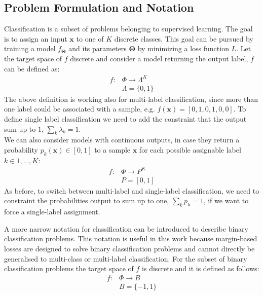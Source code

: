 \documentclass[sn-mathphys-num]{sn-jnl}%
\renewcommand\vec{\mathbf}
\begin{document}
\subsection{Problem Formulation and Notation}\label{subsec-classification_losses_problem_formulation}
Classification is a subset of problems belonging to supervised learning.
The goal is to assign an input $\vec{x}$ to one of $K$ discrete classes. This goal can be pursued by training a model $f_{\vec{\Theta}}$ and its parameters $\vec{\Theta}$ by minimizing a loss function $L$. Let the target space of $f$ discrete and consider a model returning the output label, $f$ can be defined as:
\begin{align*}
        f \colon &\Phi \to \Lambda^K\\
        &\Lambda = \{0,1\}
\end{align*}
The above definition is working also for multi-label classification, since more than one label could be associated with a sample, e.g. $f(\vec{x})= [0, 1, 0, 1, 0, 0]$. To define single label classification we need to add the constraint that the output sum up to $1$, $\sum_k \lambda_k = 1$.\\
We can also consider models with continuous outputs, in case they return a probability $p_k(\vec{x}) \in [0,1]$ to a sample $\vec{x}$ for each possible assignable label $k \in 1, ..., K$:
\begin{align*}
        f \colon &\Phi \to P^K\\
        &P = [0,1]
\end{align*}
As before, to switch between multi-label and single-label classification,  we need to constraint the probabilities output to sum up to one, $\sum_k p_k = 1$, if we want to force a single-label assignment.

A more narrow notation for classification can be introduced to describe binary classification problems. This notation is useful in this work because margin-based losses are designed to solve binary classification problems and cannot directly be generalised to multi-class or multi-label classification. For the subset of binary classification problems the target space of $f$ is discrete and it is defined as follows:
\begin{align*}
        f \colon &\Phi \to B\\
        &B = \{-1,1\}
\end{align*}
\end{document}
